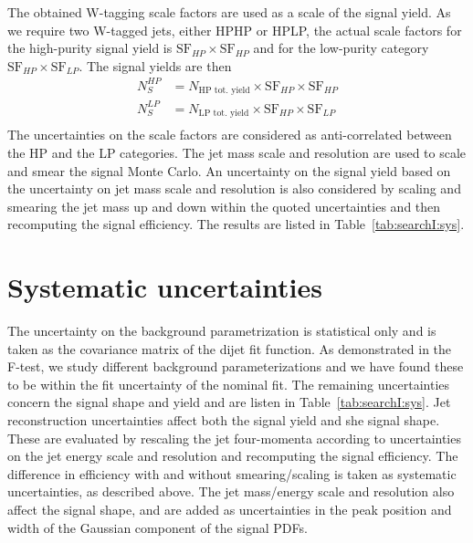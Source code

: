 The obtained W-tagging scale factors are used as a scale of the signal yield. As we require two W-tagged jets, either HPHP or HPLP, the actual scale factors for the high-purity signal yield is $\textrm{SF}_{HP}\times\textrm{SF}_{HP}$ and for the low-purity category $\textrm{SF}_{HP}\times\textrm{SF}_{LP}$. The signal yields are then
\begin{align*}
N_{S}^{HP} &= N_{\textrm{HP tot. yield}} \times \textrm{SF}_{HP} \times \textrm{SF}_{HP}\\
N_{S}^{LP} &= N_{\textrm{LP tot. yield}} \times \textrm{SF}_{HP} \times \textrm{SF}_{LP}\\
\end{align*}
The uncertainties on the scale factors are considered as anti-correlated between the HP and the LP categories.
The jet mass scale and resolution are used to scale and smear the signal Monte Carlo. An uncertainty on the signal yield based on the uncertainty on jet mass scale and resolution is also considered by scaling and smearing the jet mass up and down within the quoted uncertainties and then recomputing the signal efficiency. The results are listed in Table~\ref{tab:searchI:sys}.
  
\section{Systematic uncertainties}
\label{sec:searchI:sys}

The uncertainty on the background parametrization is statistical only and is taken as the covariance matrix of the dijet fit function. As demonstrated in the F-test, we study different background parameterizations and we have found these to be within the fit uncertainty of the nominal fit. The remaining uncertainties concern the signal shape and yield and are listen in Table~\ref{tab:searchI:sys}. Jet reconstruction uncertainties affect both the signal yield and she signal shape. These are evaluated by rescaling the jet four-momenta according to uncertainties on the jet energy scale and resolution and recomputing the signal efficiency. The difference in efficiency with and without smearing/scaling is taken as systematic uncertainties, as described above.
The jet mass/energy scale and resolution also affect the signal shape, and are added as uncertainties in the peak position and width of the Gaussian component of the signal PDFs.

